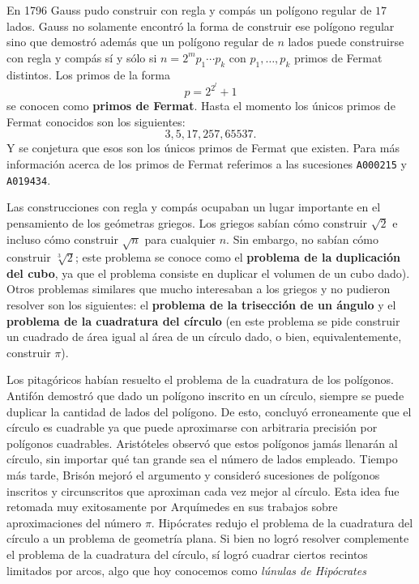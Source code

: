 En 1796 Gauss pudo construir con regla y compás un polígono regular de $17$
lados. Gauss no solamente encontró la forma de construir ese polígono regular
sino que demostró además que un polígono regular de $n$ lados puede construirse
con regla y compás sí y sólo si $n=2^mp_1\cdots p_k$ con $p_1,\dots,p_k$ primos
de Fermat distintos. Los primos de la forma 
\[
	p=2^{2^l}+1
\]
se conocen como \textbf{primos de Fermat}. Hasta el momento los únicos primos
de Fermat conocidos son los siguientes:
\[
	3,5,17,257,65537.
\]
Y se conjetura que esos son los únicos primos de Fermat que existen. Para más
información acerca de los primos de Fermat referimos a
las sucesiones \verb+A000215+ y \verb+A019434+.

Las construcciones con regla y compás ocupaban un lugar importante en el
pensamiento de los geómetras griegos. Los griegos sabían cómo construir
$\sqrt{2}$ e incluso cómo construir $\sqrt{n}$ para cualquier $n$. Sin embargo,
no sabían cómo construir $\sqrt[3]{2}$; este problema se conoce como el
\textbf{problema de la duplicación del cubo}, ya que el problema consiste en
duplicar el volumen de un cubo dado). Otros problemas similares que mucho
interesaban a los griegos y no pudieron resolver son los siguientes: el
\textbf{problema de la trisección de un ángulo} y el \textbf{problema de la
cuadratura del círculo} (en este problema se pide construir un cuadrado de área
igual al área de un círculo dado, o bien, equivalentemente, construir $\pi$).

Los pitagóricos habían resuelto el problema de la cuadratura de los polígonos.
Antifón demostró que dado un polígono inscrito en un círculo, siempre se puede
duplicar la cantidad de lados del polígono. De esto, concluyó erroneamente que
el círculo es cuadrable ya que puede aproximarse con arbitraria precisión por
polígonos cuadrables. Aristóteles observó que estos polígonos jamás llenarán al
círculo, sin importar qué tan grande sea el número de lados empleado. Tiempo
más tarde, Brisón mejoró el argumento y consideró sucesiones de polígonos
inscritos y circunscritos que aproximan cada vez mejor al círculo. Esta idea
fue retomada muy exitosamente por Arquímedes en sus trabajos sobre
aproximaciones del número $\pi$. Hipócrates redujo el problema de la cuadratura
del círculo a un problema de geometría plana. Si bien no logró resolver
complemente el problema de la cuadratura del círculo, sí logró cuadrar ciertos
recintos limitados por arcos, algo que hoy conocemos como \emph{lúnulas de
Hipócrates}


